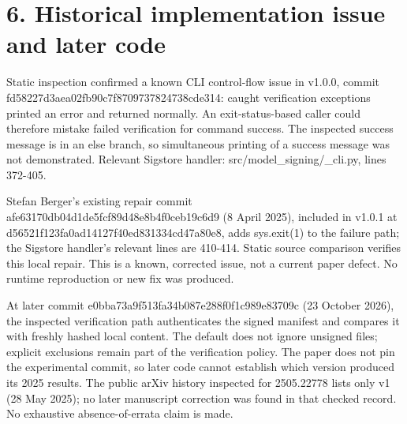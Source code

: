 \documentclass[10pt]{article}
\begin{document}
\section*{6. Historical implementation issue and later code}
Static inspection confirmed a known CLI control-flow issue in v1.0.0, commit fd58227d3aea02fb90c7f8709737824738cde314: caught verification exceptions printed an error and returned normally. An exit-status-based caller could therefore mistake failed verification for command success. The inspected success message is in an else branch, so simultaneous printing of a success message was not demonstrated. Relevant Sigstore handler: src/model\_signing/\_cli.py, lines 372-405.\par
Stefan Berger’s existing repair commit afe63170db04d1de5fcf89d48e8b4f0ceb19c6d9 (8 April 2025), included in v1.0.1 at d56521f123fa0ad14127f40ed831334cd47a80e8, adds sys.exit(1) to the failure path; the Sigstore handler’s relevant lines are 410-414. Static source comparison verifies this local repair. This is a known, corrected issue, not a current paper defect. No runtime reproduction or new fix was produced.\par
At later commit e0bba73a9f513fa34b087e288f0f1c989e83709c (23 October 2026), the inspected verification path authenticates the signed manifest and compares it with freshly hashed local content. The default does not ignore unsigned files; explicit exclusions remain part of the verification policy. The paper does not pin the experimental commit, so later code cannot establish which version produced its 2025 results. The public arXiv history inspected for 2505.22778 lists only v1 (28 May 2025); no later manuscript correction was found in that checked record. No exhaustive absence-of-errata claim is made.\par
\end{document}
